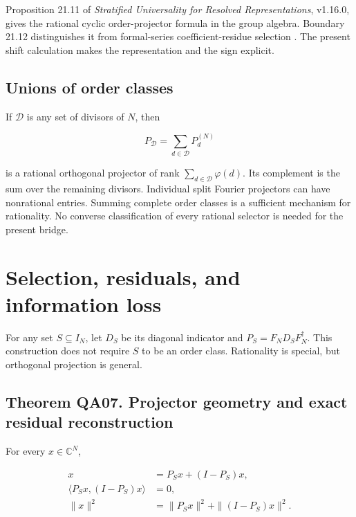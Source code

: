 Proposition 21.11 of \emph{Stratified Universality for Resolved
Representations}, v1.16.0, gives the rational cyclic order-projector
formula in the group algebra. Boundary 21.12 distinguishes it from
formal-series coefficient-residue selection \cite{KomorebiStratified16}.
The present shift calculation makes the representation and the sign
explicit.

\hypertarget{unions-of-order-classes}{%
\subsection{Unions of order
classes}\label{unions-of-order-classes}}

If \(\mathcal D\) is any set of divisors of \(N\), then

\[
P_{\mathcal D}=\sum_{d\in\mathcal D}P_d^{(N)}
\]

is a rational orthogonal projector of rank
\(\sum_{d\in\mathcal D}\varphi(d)\). Its complement is the sum over the
remaining divisors. Individual split Fourier projectors can have
nonrational entries. Summing complete order classes is a sufficient
mechanism for rationality. No converse classification of every rational
selector is needed for the present bridge.

\hypertarget{selection-residuals-and-information-loss}{%
\section{Selection, residuals, and information
loss}\label{selection-residuals-and-information-loss}}

For any set \(S\subseteq I_N\), let \(D_S\) be its diagonal indicator
and \(P_S=F_ND_SF_N^\dagger\). This construction does not require \(S\)
to be an order class. Rationality is special, but orthogonal projection
is general.

\hypertarget{theorem-qa07.-projector-geometry-and-exact-residual-reconstruction}{%
\subsection*{Theorem QA07. Projector geometry and exact residual
reconstruction}\label{theorem-qa07.-projector-geometry-and-exact-residual-reconstruction}}

For every \(x\in\mathbb C^N\),

\[
\begin{aligned}
x&=P_Sx+(I-P_S)x,\\
\langle P_Sx,(I-P_S)x\rangle&=0,\\
\|x\|^2&=\|P_Sx\|^2+\|(I-P_S)x\|^2.
\end{aligned}
\]

